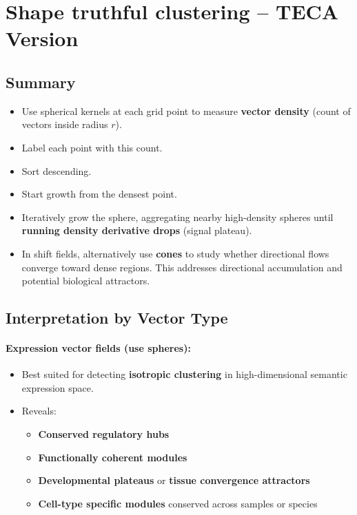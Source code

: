 \section{Shape truthful clustering -- TECA Version}%
    \label{bobito}%

    \subsection{Summary}
        \begin{itemize}
            \item Use spherical kernels at each grid point to measure \textbf{vector density} (count of vectors inside radius $r$).
            \item Label each point with this count.
            \item Sort descending.
            \item Start growth from the densest point.
            \item Iteratively grow the sphere, aggregating nearby high-density spheres until \textbf{running density derivative drops} (signal plateau).
            \item In shift fields, alternatively use \textbf{cones} to study whether directional flows converge toward dense regions. This addresses directional accumulation and potential biological attractors.
        \end{itemize}

    \subsection{Interpretation by Vector Type}
        \paragraph{Expression vector fields (use spheres):}
        \begin{itemize}
            \item Best suited for detecting \textbf{isotropic clustering} in high-dimensional semantic expression space.
            \item Reveals:
                  \begin{itemize}
                      \item \textbf{Conserved regulatory hubs}
                      \item \textbf{Functionally coherent modules}
                      \item \textbf{Developmental plateaus} or \textbf{tissue convergence attractors}
                      \item \textbf{Cell-type specific modules} conserved across samples or species
                  \end{itemize}
        \end{itemize}

